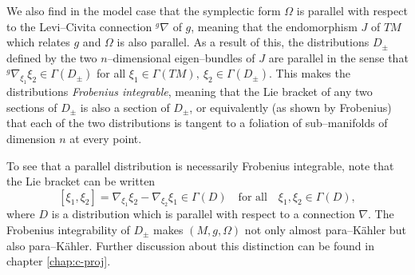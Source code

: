 We also find in the model case that the symplectic form $\Omega$ is parallel with respect to the Levi--Civita connection $^g\nabla$ of $g$, meaning that the endomorphism $J$ of $TM$ which relates $g$ and $\Omega$ is also parallel. As a result of this, the distributions $D_\pm$ defined by the two $n$--dimensional eigen--bundles of $J$ are parallel in the sense that $^g\nabla_{\xi_1}\xi_2\in\Gamma(D_\pm)$ for all $\xi_1\in \Gamma(TM),\ \xi_2\in\Gamma(D_\pm)$. This makes the distributions \textit{Frobenius integrable}, meaning that the Lie bracket of any two sections of $D_\pm$ is also a section of $D_\pm$, or equivalently (as shown by Frobenius) that each of the two distributions is tangent to a foliation of sub--manifolds of dimension $n$ at every point.

To see that a parallel distribution is necessarily Frobenius integrable, note that the Lie bracket can be written
\[
[\xi_1,\xi_2]= \nabla_{\xi_1}\xi_2- \nabla_{\xi_2}\xi_1\in\Gamma(D)\quad\mbox{for all}\quad \xi_1,\xi_2\in\Gamma(D),
\]
where $D$ is a distribution which is parallel with respect to a connection $\nabla$. The Frobenius integrability of $D_\pm$ makes $(M,g,\Omega)$ not only almost para--K\"ahler but also para--K\"ahler. Further discussion about this distinction can be found in chapter \ref{chap:c-proj}.